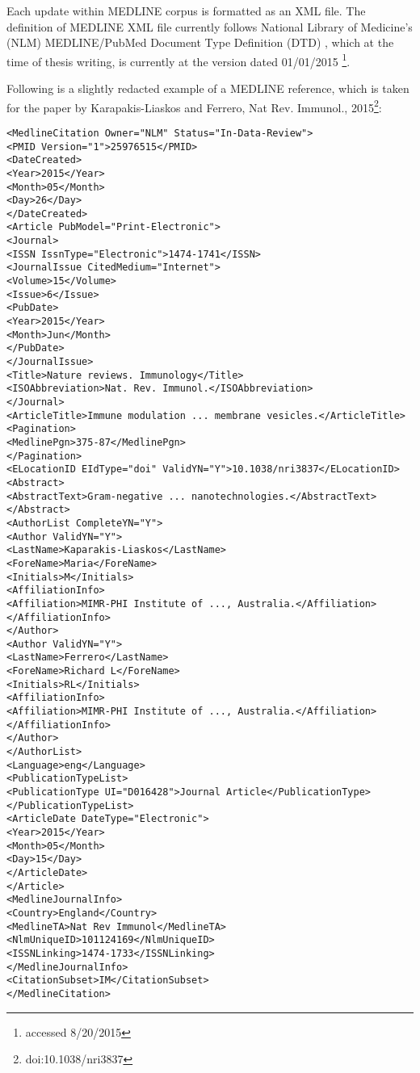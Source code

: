 Each update within MEDLINE corpus is formatted as an XML file. The definition of MEDLINE XML file currently follows National Library of Medicine's (NLM) MEDLINE/PubMed Document Type Definition (DTD) \citep{MEDLINEDTD}, which at the time of thesis writing, is currently at the version dated 01/01/2015 \footnote{accessed 8/20/2015}.


Following is a slightly redacted example of a MEDLINE reference, which is taken for the paper by Karapakis-Liaskos and Ferrero, Nat Rev. Immunol., 2015\footnote{doi:10.1038/nri3837}:

\begin{verbatim}
<MedlineCitation Owner="NLM" Status="In-Data-Review">
<PMID Version="1">25976515</PMID>
<DateCreated>
<Year>2015</Year>
<Month>05</Month>
<Day>26</Day>
</DateCreated>
<Article PubModel="Print-Electronic">
<Journal>
<ISSN IssnType="Electronic">1474-1741</ISSN>
<JournalIssue CitedMedium="Internet">
<Volume>15</Volume>
<Issue>6</Issue>
<PubDate>
<Year>2015</Year>
<Month>Jun</Month>
</PubDate>
</JournalIssue>
<Title>Nature reviews. Immunology</Title>
<ISOAbbreviation>Nat. Rev. Immunol.</ISOAbbreviation>
</Journal>
<ArticleTitle>Immune modulation ... membrane vesicles.</ArticleTitle>
<Pagination>
<MedlinePgn>375-87</MedlinePgn>
</Pagination>
<ELocationID EIdType="doi" ValidYN="Y">10.1038/nri3837</ELocationID>
<Abstract>
<AbstractText>Gram-negative ... nanotechnologies.</AbstractText>
</Abstract>
<AuthorList CompleteYN="Y">
<Author ValidYN="Y">
<LastName>Kaparakis-Liaskos</LastName>
<ForeName>Maria</ForeName>
<Initials>M</Initials>
<AffiliationInfo>
<Affiliation>MIMR-PHI Institute of ..., Australia.</Affiliation>
</AffiliationInfo>
</Author>
<Author ValidYN="Y">
<LastName>Ferrero</LastName>
<ForeName>Richard L</ForeName>
<Initials>RL</Initials>
<AffiliationInfo>
<Affiliation>MIMR-PHI Institute of ..., Australia.</Affiliation>
</AffiliationInfo>
</Author>
</AuthorList>
<Language>eng</Language>
<PublicationTypeList>
<PublicationType UI="D016428">Journal Article</PublicationType>
</PublicationTypeList>
<ArticleDate DateType="Electronic">
<Year>2015</Year>
<Month>05</Month>
<Day>15</Day>
</ArticleDate>
</Article>
<MedlineJournalInfo>
<Country>England</Country>
<MedlineTA>Nat Rev Immunol</MedlineTA>
<NlmUniqueID>101124169</NlmUniqueID>
<ISSNLinking>1474-1733</ISSNLinking>
</MedlineJournalInfo>
<CitationSubset>IM</CitationSubset>
</MedlineCitation>
\end{verbatim}


